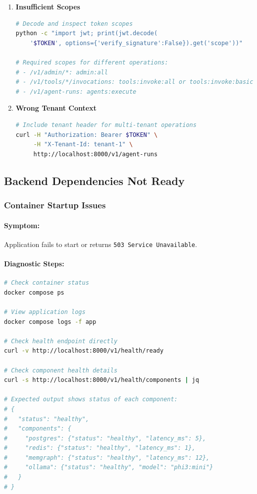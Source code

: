 \begin{enumerate}
    \item \textbf{Insufficient Scopes}
    \begin{lstlisting}[language=bash, caption=Check token scopes]
# Decode and inspect token scopes
python -c "import jwt; print(jwt.decode(
    '$TOKEN', options={'verify_signature':False}).get('scope'))"

# Required scopes for different operations:
# - /v1/admin/*: admin:all
# - /v1/tools/*/invocations: tools:invoke:all or tools:invoke:basic
# - /v1/agent-runs: agents:execute
    \end{lstlisting}
    
    \item \textbf{Wrong Tenant Context}
    \begin{lstlisting}[language=bash, caption=Set tenant context header]
# Include tenant header for multi-tenant operations
curl -H "Authorization: Bearer $TOKEN" \
     -H "X-Tenant-Id: tenant-1" \
     http://localhost:8000/v1/agent-runs
    \end{lstlisting}
\end{enumerate}

\subsection{Backend Dependencies Not Ready}

\subsubsection{Container Startup Issues}

\paragraph{Symptom:} Application fails to start or returns \texttt{503 Service Unavailable}.

\paragraph{Diagnostic Steps:}

\begin{lstlisting}[language=bash, caption=Diagnosing container startup issues]
# Check container status
docker compose ps

# View application logs
docker compose logs -f app

# Check health endpoint directly
curl -v http://localhost:8000/v1/health/ready

# Check component health details
curl -s http://localhost:8000/v1/health/components | jq

# Expected output shows status of each component:
# {
#   "status": "healthy",
#   "components": {
#     "postgres": {"status": "healthy", "latency_ms": 5},
#     "redis": {"status": "healthy", "latency_ms": 1},
#     "memgraph": {"status": "healthy", "latency_ms": 12},
#     "ollama": {"status": "healthy", "model": "phi3:mini"}
#   }
# }
\end{lstlisting}

